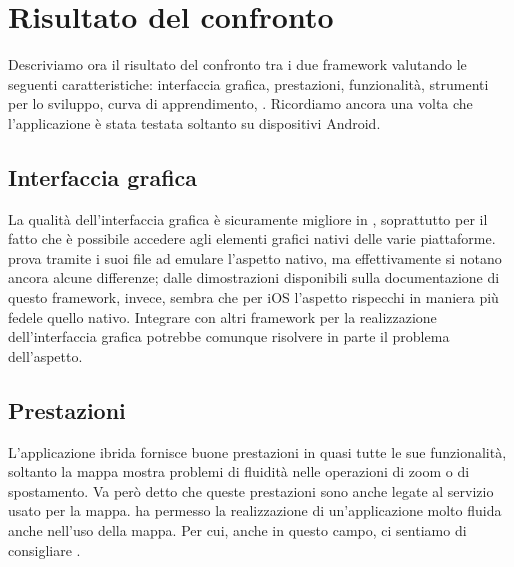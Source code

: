 \chapter{Risultato del confronto}
    Descriviamo ora il risultato del confronto tra i due frame\-work valutando
    le seguenti caratteristiche: interfaccia grafica, prestazioni,
    funzionalità, strumenti per lo sviluppo, curva di apprendimento,
    \crossplat{}. Ricordiamo ancora una
    volta che l'applicazione è stata testata soltanto su dispositivi Android.


    \section{Interfaccia grafica}
    La qualità dell'interfaccia grafica è sicuramente migliore in \tisdk{},
    soprattutto per il fatto che è possibile accedere agli elementi
    grafici nativi delle varie piattaforme. \kendomob{} prova tramite i
    suoi file \css{} ad emulare l'aspetto nativo, ma effettivamente si
    notano ancora alcune differenze; dalle dimostrazioni disponibili sulla
    documentazione di questo frame\-work, invece, sembra che per iOS l'aspetto
    rispecchi in maniera più fedele quello nativo. Integrare \pg{} con
    altri frame\-work per la realizzazione dell'interfaccia grafica potrebbe
    comunque risolvere in parte il problema dell'aspetto.


    \section{Prestazioni}
    L'applicazione ibrida fornisce buone prestazioni in quasi tutte
    le sue funzionalità, soltanto la mappa mostra problemi di fluidità
    nelle operazioni di zoom o di spostamento. Va però detto che queste
    prestazioni sono anche legate al servizio usato per la mappa.
    \tisdk{} ha permesso la realizzazione di un'applicazione molto fluida
    anche nell'uso della mappa. Per cui, anche in questo campo, ci sentiamo
    di consigliare \tisdk{}.


